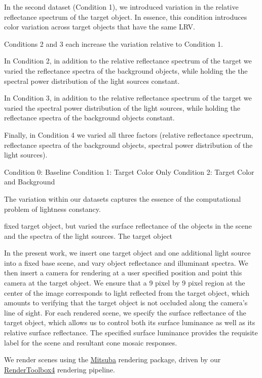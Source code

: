 \documentclass{jov}
\begin{document}
In the second dataset (Condition 1), we introduced variation in the relative reflectance spectrum of the target object.
In essence, this condition introduces color variation across target objects that have the same LRV.

Conditions 2 and 3 each increase the variation relative to Condition 1.

In Condition 2, in addition to the relative reflectance spectrum of the target
we varied the reflectance spectra of the background objects,
while holding the the spectral power distribution of the light sources
constant.

In Condition 3, in addition to the relative reflectance spectrum of the target
we varied the spectral power distribution of the light sources,
while holding the reflectance spectra of the background objects constant.

Finally, in Condition 4 we varied all three factors (relative reflectance spectrum,
reflectance spectra of the background objects, spectral power distribution of the light sources).


Condition 0: Baseline
Condition 1: Target Color Only
Condition 2: Target Color and Background

The variation within our datasets captures the essence of the computational problem of lightness constancy.

 fixed target object, but varied the surface reflectance of the objects in the scene and the spectra of the light sources.
The target object 

In the present work, we insert one target object and one additional light source into a fixed base scene, and vary object reflectance and illuminant spectra.
We then insert a camera for rendering at a user specified position and point this camera at the target object.
We ensure that a 9 pixel by 9 pixel region at the center of the image corresponds to light reflected from the target object, which amounts to verifying that the target object is not occluded along the camera's line of sight.
For each rendered scene, we specify the surface reflectance of the target object, which allows us to control both its surface luminance as well as its relative surface reflectance.
The specified surface luminance provides the requisite label for the scene and resultant cone mosaic responses.

We render scenes using the \href{https://www.mitsuba-renderer.org}{Mitsuba} \cite{jakob2015mitsuba} rendering package, driven by our \href{http://rendertoolbox.org}{RenderToolbox4} \cite{heasly2014rendertoolbox3} rendering pipeline.
\end{document}
